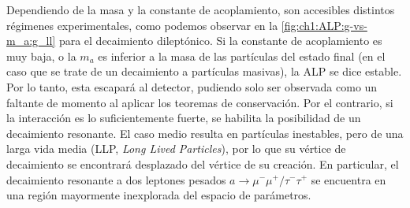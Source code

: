 Dependiendo de la masa y la constante de acoplamiento, son accesibles distintos régimenes experimentales, como podemos observar en la \cref{fig:ch1:ALP:g-vs-m_a:g_ll} para el decaimiento dileptónico. Si la constante de acoplamiento es muy baja, o la $m_a$ es inferior a la masa de las partículas del estado final (en el caso que se trate de un decaimiento a partículas masivas), la ALP se dice estable. Por lo tanto, esta escapará al detector, pudiendo solo ser observada como un faltante de momento al aplicar los teoremas de conservación. Por el contrario, si la interacción es lo suficientemente fuerte, se habilita la posibilidad de un decaimiento resonante. El caso medio resulta en partículas inestables, pero de una larga vida media (LLP, \textit{Long Lived Particles}), por lo que su vértice de decaimiento se encontrará desplazado del vértice de su creación. En particular, el decaimiento resonante a dos leptones pesados $a \to \mu^-\mu^+/\tau^-\tau^+$ se encuentra en una región mayormente inexplorada del espacio de parámetros.

